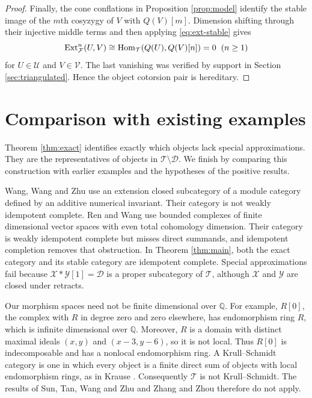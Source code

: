 \documentclass[11pt,a4paper,reqno]{amsart}
\newcommand{\Dcal}{\mathcal D}
\newcommand{\Tcal}{\mathcal T}
\newcommand{\Xcal}{\mathcal X}
\newcommand{\Hom}{\operatorname{Hom}}
\theoremstyle{plain}
\theoremstyle{definition}
\theoremstyle{remark}
\newcommand{\Fcal}{\mathcal F}
\newcommand{\Ycal}{\mathcal Y}
\newcommand{\Ucal}{\mathcal U}
\newcommand{\Vcal}{\mathcal V}
\newcommand{\Ext}{\operatorname{Ext}}
\begin{document}
\begin{proof}
Finally, the cone conflations in Proposition \ref{prop:model} identify the stable image of the $m$th cosyzygy of $V$ with $Q(V)[m]$. Dimension shifting through their injective middle terms and then applying \eqref{eq:ext-stable} gives
$$
\Ext^n_{\Fcal}(U,V)\cong\Hom_{\Tcal}(Q(U),Q(V)[n])=0
\hspace{2mm}(n\geq1)
$$
for $U\in\Ucal$ and $V\in\Vcal$. The last vanishing was verified by support in Section \ref{sec:triangulated}. Hence the object cotorsion pair is hereditary.
\end{proof}

\section{Comparison with existing examples}\label{sec:comparison}

Theorem \ref{thm:exact} identifies exactly which objects lack special approximations. They are the representatives of objects in $\Tcal\setminus\Dcal$. We finish by comparing this construction with earlier examples and the hypotheses of the positive results.

Wang, Wang and Zhu \cite{WWZ26} use an extension closed subcategory of a module category defined by an additive numerical invariant. Their category is not weakly idempotent complete. Ren and Wang \cite[Sections~3--4]{RW26} use bounded complexes of finite dimensional vector spaces with even total cohomology dimension. Their category is weakly idempotent complete but misses direct summands, and idempotent completion removes that obstruction. In Theorem \ref{thm:main}, both the exact category and its stable category are idempotent complete. Special approximations fail because $\Xcal*\Ycal[1]=\Dcal$ is a proper subcategory of $\Tcal$, although $\Xcal$ and $\Ycal$ are closed under retracts.

Our morphism spaces need not be finite dimensional over $\mathbb Q$. For example, $R[0]$, the complex with $R$ in degree zero and zero elsewhere, has endomorphism ring $R$, which is infinite dimensional over $\mathbb Q$. Moreover, $R$ is a domain with distinct maximal ideals $(x,y)$ and $(x-3,y-6)$, so it is not local. Thus $R[0]$ is indecomposable and has a nonlocal endomorphism ring. A Krull--Schmidt category is one in which every object is a finite direct sum of objects with local endomorphism rings, as in Krause \cite[Section~4]{Kra15}. Consequently $\Tcal$ is not Krull--Schmidt. The results of Sun, Tan, Wang and Zhu \cite[Corollary~1.3]{STWZ25} and Zhang and Zhou \cite[Theorem~3.11]{ZZ26} therefore do not apply.
\end{document}
